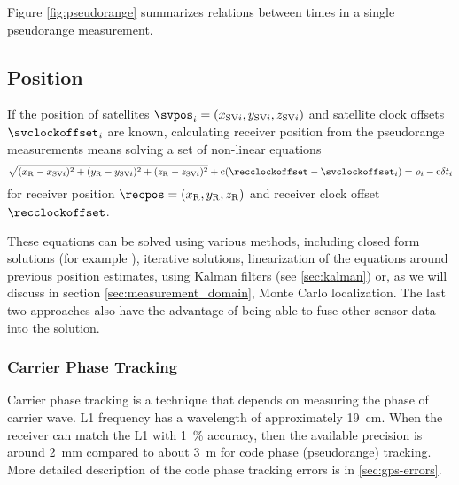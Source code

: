 
Figure \ref{fig:pseudorange} summarizes relations between times in a single pseudorange measurement.

\subsection{Position}

If the position of satellites \(\svpos_i = \coord{x_{\mathrm{SV}i}}{y_{\mathrm{SV}i}}{z_{\mathrm{SV}i}}\) and satellite
clock offsets \(\svclockoffset_i\) are known,
calculating receiver position from the pseudorange measurements means solving a set of non-linear equations
\begin{equation}
	\sqrt{(x_\REC - x_{{\SV}i})^2 + (y_\REC - y_{{\SV}i})^2 +(z_\REC - z_{{\SV}i})^2} +
	\speedoflight (\recclockoffset - \svclockoffset_i)
	=
	\rho_i - \speedoflight\geomrangedelays_i
\end{equation}
for receiver position \(\recpos = \coord{x_\REC}{y_\REC}{z_\REC}\) and receiver clock offset \(\recclockoffset\).

These equations can be solved using various methods, including closed form solutions
(for example \cite{leva96}), iterative solutions, linearization of the equations around
previous position estimates, using Kalman filters (see \ref{sec:kalman}) or,
as we will discuss in section \ref{sec:measurement_domain}, Monte Carlo localization.
The last two approaches also have the advantage of being able to fuse other sensor data
into the solution.

\subsubsection{Carrier Phase Tracking}
\label{sec:gps_carrier_phase}

Carrier phase tracking is a technique that depends on measuring the phase of carrier wave.
L1 frequency has a wavelength of approximately \SI{19}{\centi\meter}.
When the receiver can match the L1 with \SI{1}{\percent} accuracy, then the available precision
is around \SI{2}{\milli\meter} compared to about \SI{3}{\meter} for code phase (pseudorange)
tracking. More detailed description of the code phase tracking errors is in \autoref{sec:gps-errors}.

